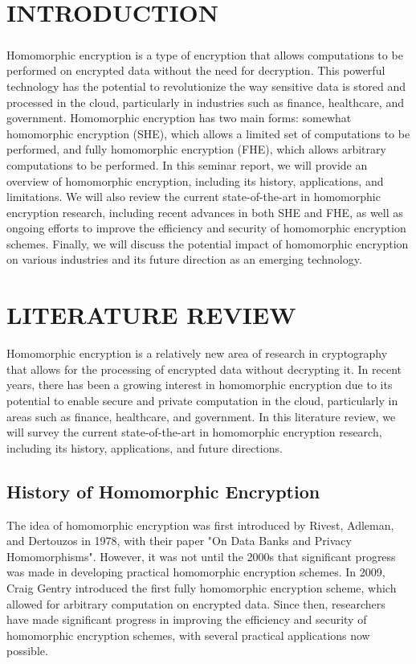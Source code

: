 \documentclass[a4paper,11pt]{report}
\begin{document}
  \tableofcontents
\thispagestyle{empty}

\chapter{INTRODUCTION}

\paragraph{}Homomorphic encryption is a type of encryption that allows computations to be performed on encrypted data without the need for decryption. This powerful technology has the potential to revolutionize the way sensitive data is stored and processed in the cloud, particularly in industries such as finance, healthcare, and government. Homomorphic encryption has two main forms: somewhat homomorphic encryption (SHE), which allows a limited set of computations to be performed, and fully homomorphic encryption (FHE), which allows arbitrary computations to be performed. In this seminar report, we will provide an overview of homomorphic encryption, including its history, applications, and limitations. We will also review the current state-of-the-art in homomorphic encryption research, including recent advances in both SHE and FHE, as well as ongoing efforts to improve the efficiency and security of homomorphic encryption schemes. Finally, we will discuss the potential impact of homomorphic encryption on various industries and its future direction as an emerging technology.
  
\chapter{LITERATURE REVIEW}
Homomorphic encryption is a relatively new area of research in cryptography that allows for the processing of encrypted data without decrypting it. In recent years, there has been a growing interest in homomorphic encryption due to its potential to enable secure and private computation in the cloud, particularly in areas such as finance, healthcare, and government. In this literature review, we will survey the current state-of-the-art in homomorphic encryption research, including its history, applications, and future directions.
\section{History of Homomorphic Encryption}
The idea of homomorphic encryption was first introduced by Rivest, Adleman, and Dertouzos in 1978, with their paper "On Data Banks and Privacy Homomorphisms". However, it was not until the 2000s that significant progress was made in developing practical homomorphic encryption schemes. In 2009, Craig Gentry introduced the first fully homomorphic encryption scheme, which allowed for arbitrary computation on encrypted data. Since then, researchers have made significant progress in improving the efficiency and security of homomorphic encryption schemes, with several practical applications now possible.
\end{document}
